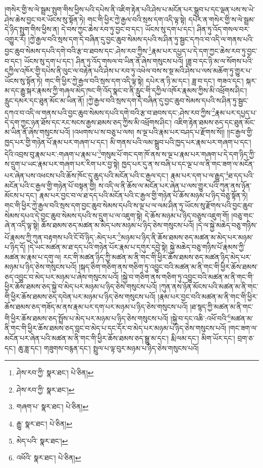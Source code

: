 །གསེར་གྱི་ས་ལེ་སྦྲམ་སྤུག་གིས་ཕྱིས་པའི་དཔེས་ནི་འཇིག་རྟེན་པའི་ཤེས་པ་མངོན་པར་སྒྲུབ་པ་དང་ལྡན་པས་ས་ཡེ་ཤེས་ཆེས་བྱང་བར་ཡོངས་སུ་སྟོན་ཏེ། གང་གི་ཕྱིར་ཀྱེ་རྒྱལ་བའི་སྲས་དག་འདི་ལྟ་སྟེ། དཔེར་ན་གསེར་གྱི་ས་ལེ་སྦྲམ་དེ་ཉིད་སྤུག་གིས་ཕྱིས་ན། དེ་བས་ཀྱང་ཆེས་རབ་ཏུ་བྱང་བ་དང་། ཡོངས་སུ་དག་པ་དང་། ཤིན་ཏུ་འོད་གསལ་བར་འགྱུར་རོ། །ཀྱེ་རྒྱལ་བའི་སྲས་དག་དེ་བཞིན་དུ་བྱང་ཆུབ་སེམས་དཔའི་ས་ཤིན་ཏུ་སྦྱང་དཀའ་བ་འདི་ལ་གནས་པའི་བྱང་ཆུབ་སེམས་དཔའི་དགེ་བའི་རྩ་བ་ཐབས་དང་:ཤེས་རབ་ཀྱིས་\footnote{ཤེས་རབ་ཀྱི་  སྣར་ཐང་།  པེ་ཅིན། }རྣམ་པར་དཔྱད་པ་དེ་དག་ཀྱང་ཆེས་རབ་ཏུ་བྱང་བ་དང་། ཡོངས་སུ་དག་པ་དང་། ཤིན་ཏུ་འོད་གསལ་བ་ཡིན་ནོ་ཞེས་གསུངས་པའོ། །ཟླ་བ་དང་ཉི་མ་ལ་སོགས་པའི་དཀྱིལ་འཁོར་གྱི་དཔེས་ནི་ལུང་ལ་བརྟེན་པའི་ཤེས་པ་རབ་ཏུ་འཕེལ་བས་ས་སྔ་མའི་ཤེས་པ་ལས་མཆོག་ཏུ་གྱུར་པ་ཡོངས་སུ་སྟོན་ཏེ། གང་གི་ཕྱིར་ཀྱེ་རྒྱལ་བའི་སྲས་དག་འདི་ལྟ་སྟེ། དཔེར་ན་ཉི་མ་དང་། ཟླ་བ་དང་། གཟའ་དང་། སྐར་མ་དང་རྒྱུ་སྐར་རྣམས་ཀྱི་གཞལ་མེད་ཁང་གི་འོད་སྣང་བ་ནི་རླུང་གི་དཀྱིལ་འཁོར་རྣམས་ཀྱིས་མི་འཕྲོགས་ཤིང་། རླུང་དམར་དང་ཐུན་མོང་མ་ཡིན་ནོ། །ཀྱེ་རྒྱལ་བའི་སྲས་དག་དེ་བཞིན་དུ་བྱང་ཆུབ་སེམས་དཔའི་ས་ཤིན་ཏུ་སྦྱང་དཀའ་བ་འདི་ལ་གནས་པའི་བྱང་ཆུབ་སེམས་དཔའི་དགེ་བའི་རྩ་བ་ཐབས་དང་:ཤེས་རབ་ཀྱིས་\footnote{ཤེས་རབ་ཀྱི་  སྣར་ཐང་། }རྣམ་པར་དཔྱད་པ་དེ་དག་ཀྱང་ཉན་ཐོས་དང་རང་སངས་རྒྱས་ཐམས་ཅད་ཀྱིས་མི་འཕྲོགས་ཤིང་། འཇིག་རྟེན་ཐམས་ཅད་དང་ཐུན་མོང་མ་ཡིན་ནོ་ཞེས་གསུངས་པའོ། །འཕགས་པ་ས་བཅུ་པ་ལས། ས་ལྔ་པའི་རྣམ་པར་བཤད་པ་རྫོགས་སོ།། །།ང་རྒྱལ་གྱི་ཁྱད་པར་གྱི་གཉེན་པོ་རྣམ་པར་གཞག་པ་དང་། མི་གནས་པའི་ལམ་སྒྲུབ་པའི་ཁྱད་པར་རྣམ་པར་གཞག་པ་དང་། དེའི་འབྲས་བུ་རྣམ་པར་:གཞག་པ་རྣམ་པ་\footnote{གཞག་པ་  སྣར་ཐང་།  པེ་ཅིན། }གསུམ་པོ་གང་དག་ཁོ་ནས་ས་ལྔ་པ་རྣམ་པར་གཞག་པ་དེ་དག་ཉིད་ཀྱི་ས་དྲུག་པ་ཡང་རྣམ་པར་གཞག་པར་རིག་པར་བྱ་སྟེ། ཁྱད་པར་དུ་ན་ས་བཞི་པ་དང་ལྔ་པ་ལ་ནི་གང་ཟག་ལ་མངོན་པར་ཞེན་པས་འཕངས་པའི་ཆོས་ཁོང་དུ་ཆུད་པའི་མངོན་པའི་ང་རྒྱལ་དང་། རྣམ་པར་དག་པ་ལ་རྒྱུད་\footnote{རྒྱུ་  སྣར་ཐང་།  པེ་ཅིན། }ཐ་དད་པའི་མངོན་པའི་ང་རྒྱལ་གྱི་གཉེན་པོ་བསྟན་གྱི། ས་འདི་ལ་ནི་ཆོས་ལ་མངོན་པར་ཞེན་པ་ལས་གྱུར་པའི་ཀུན་ནས་ཉོན་མོངས་པ་དང་། རྣམ་པར་བྱང་བ་ལ་ཐ་དད་པའི་མངོན་པའི་ང་རྒྱལ་གྱི་གཉེན་པོ་ཆོས་མཉམ་པ་ཉིད་བཅུ་སྟོན་ཏེ། གང་གི་ཕྱིར་ཀྱེ་རྒྱལ་བའི་སྲས་དག་བྱང་ཆུབ་སེམས་དཔའི་ས་ལྔ་པ་ལ་ལམ་ཤིན་ཏུ་ཡོངས་སུ་རྫོགས་པའི་བྱང་ཆུབ་སེམས་དཔའ་དེ་བྱང་ཆུབ་སེམས་དཔའི་ས་དྲུག་པ་ལ་འཇུག་སྟེ། དེ་ཆོས་མཉམ་པ་ཉིད་བཅུས་འཇུག་གོ། །བཅུ་གང་ཞེ་ན་འདི་ལྟ་སྟེ། ཆོས་ཐམས་ཅད་མཚན་མ་མེད་པས་མཉམ་པ་ཉིད་ཅེས་གསུངས་པའོ། །དེ་ལ་སྐྱེ་མཆེད་བཅུ་གཉིས་པོ་རྣམས་ཀྱི་ཀུན་བརྟགས་པའི་ངོ་བོ་ཉིད་:མེད་པར་\footnote{མེད་པའི་  སྣར་ཐང་། }མཉམ་པ་ཉིད་ནི་ཆོས་ཐམས་ཅད་མཚན་མ་མེད་པར་མཉམ་པ་ཉིད་དོ། །དེ་ཡང་མཚན་མ་ཐ་དད་པའི་གཉེན་པོར་རྣམ་པ་དགུར་དབྱེ་སྟེ། སྐྱེ་མཆེད་བཅུ་གཉིས་པོ་རྣམས་ཀྱི་མཚན་མ་རྣམ་པ་དགུ་ལ། རང་གི་མཚན་ཉིད་ཀྱི་མཚན་མ་ནི་གང་གི་ཕྱིར་ཆོས་ཐམས་ཅད་མཚན་ཉིད་མེད་པར་མཉམ་པ་ཉིད་ཅེས་གསུངས་པའོ། །སྐད་ཅིག་གཅིག་ནས་གཅིག་ཏུ་འབྱུང་བའི་མཚན་མ་ནི་གང་གི་ཕྱིར་ཆོས་ཐམས་ཅད་འབྱུང་བ་མེད་པར་མཉམ་པ་ཞེས་གསུངས་པའོ། །སྐྱེ་བ་གཅིག་ནས་གཅིག་ཏུ་འབྱུང་བའི་མཚན་མ་ནི་གང་གི་ཕྱིར་ཆོས་ཐམས་ཅད་སྐྱེ་བ་མེད་པར་མཉམ་པ་ཉིད་ཅེས་གསུངས་པའོ། །ཀུན་ནས་ཉོན་མོངས་པའི་མཚན་མ་ནི་གང་གི་ཕྱིར་ཆོས་ཐམས་ཅད་དབེན་པར་མཉམ་པ་ཉིད་ཅེས་གསུངས་པའོ། །རྣམ་པར་བྱང་བའི་མཚན་མ་ནི་གང་གི་ཕྱིར་ཆོས་ཐམས་ཅད་གཟོད་མ་ནས་རྣམ་པར་དག་པར་མཉམ་པ་ཉིད་ཅེས་གསུངས་པའོ། །ཐ་སྙད་ཀྱི་མཚན་མ་ནི་གང་གི་ཕྱིར་ཆོས་ཐམས་ཅད་སྤྲོས་པ་མེད་པར་མཉམ་པ་ཉིད་ཅེས་གསུངས་པའོ། །སྐྱེ་བ་དང་འཆི་:འཕོ་བའི་\footnote{འཕོའི་  སྣར་ཐང་།  པེ་ཅིན། }མཚན་མ་ནི་གང་གི་ཕྱིར་ཆོས་ཐམས་ཅད་བླང་བ་མེད་པ་དང་དོར་བ་མེད་པར་མཉམ་པ་ཉིད་ཅེས་གསུངས་པའོ། །གང་ཟག་ལ་མངོན་པར་ཞེན་པའི་མཚན་མ་ནི་གང་གི་ཕྱིར་ཆོས་ཐམས་ཅད་སྒྱུ་མ་དང་། རྨི་ལམ་དང་། མིག་ཡོར་དང་། བྲག་ཅ་དང་། ཆུ་ཟླ་དང་། གཟུགས་བརྙན་དང་། སྤྲུལ་པ་ལྟ་བུར་མཉམ་པ་ཉིད་ཅེས་གསུངས་པའོ། 
